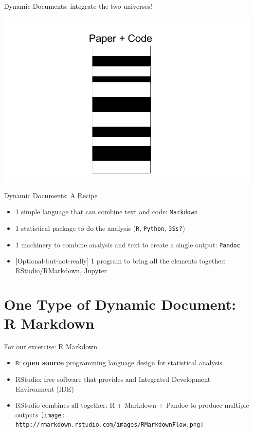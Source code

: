\documentclass[ignorenonframetext,]{beamer}
\providecommand{\tightlist}{%
\setlength{\itemsep}{0pt}\setlength{\parskip}{0pt}}
\begin{document}
\begin{frame}{Dynamic Documents: integrate the two universes!}

\includegraphics{./One universe.png}

\end{frame}

\begin{frame}[fragile]{Dynamic Documents: A Recipe}

\begin{itemize}
\tightlist
\item
  1 simple language that can combine text and code: \texttt{Markdown}
\item
  1 statistical package to do the analysis (\texttt{R}, \texttt{Python},
  \texttt{3S\textquotesingle{}s?})
\item
  1 machinery to combine analysis and text to create a single output:
  \texttt{Pandoc}
\item
  {[}Optional-but-not-really{]} 1 program to bring all the elements
  together: RStudio/RMarkdown, Jupyter
\end{itemize}

\end{frame}

\section{One Type of Dynamic Document: R
Markdown}\label{one-type-of-dynamic-document-r-markdown}

\begin{frame}[fragile]{For our excercise: R Markdown}

\begin{itemize}
\tightlist
\item
  \texttt{R}: \textbf{open source} programming language design for
  statistical analysis.\\
\item
  RStudio: free software that provides and Integrated Development
  Environment (IDE)\\
\item
  RStudio combines all together: R + Markdown + Pandoc to produce
  multiple outputs
  \texttt{[image: http://rmarkdown.rstudio.com/images/RMarkdownFlow.png]}
\end{itemize}

\end{frame}
\end{document}
